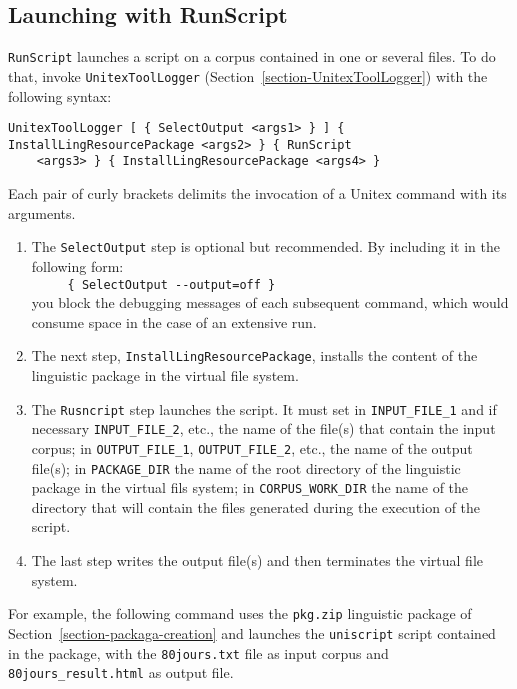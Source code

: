 \subsection{Launching with RunScript}
\label{section-runscript}
\verb$RunScript$ launches a script on a corpus contained in one or several files.
To do that, invoke \verb$UnitexToolLogger$ (Section~\ref{section-UnitexToolLogger})
with the following syntax:

\begin{Verbatim}[fontsize=\small,fontfamily=helvetica]
UnitexToolLogger [ { SelectOutput <args1> } ] { InstallLingResourcePackage <args2> } { RunScript
    <args3> } { InstallLingResourcePackage <args4> }
\end{Verbatim}

\noindent Each pair of curly brackets delimits the invocation of a Unitex command with its arguments.

\begin{enumerate}
\item The \verb$SelectOutput$ step is optional but recommended. By including it in the following form:
\\
\verb$     { SelectOutput --output=off }$\\
you block the debugging messages of each subsequent command, which would consume space in the case of an extensive run.
\item The next step, \verb$InstallLingResourcePackage$, installs the content of the linguistic package
in the virtual file system.
\item The \verb$Rusncript$ step launches the script. It must set in  \verb$INPUT_FILE_1$ and
if necessary \verb$INPUT_FILE_2$, etc., the name of the file(s) that contain the input corpus; in
\verb$OUTPUT_FILE_1$, \verb$OUTPUT_FILE_2$, etc., the name of the output file(s);
in \verb$PACKAGE_DIR$ the name of the root directory of the linguistic package in the virtual
fils system; in \verb$CORPUS_WORK_DIR$ the name of the directory that will contain the files
generated during the execution of the script.
\item The last step writes the output file(s) and then terminates the virtual file system.
\end{enumerate}

\noindent For example, the following command uses the \verb$pkg.zip$ linguistic package of
Section~\ref{section-packaga-creation} and launches the 
 \verb$uniscript$ script contained in the package, with the \verb$80jours.txt$ file as input corpus
and \verb$80jours_result.html$ as output file.

